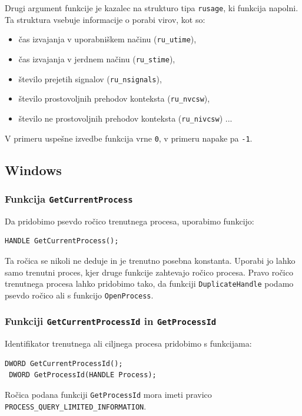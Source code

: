 \documentclass[a4paper,12pt,openright]{book}
\begin{document}
Drugi argument funkcije je kazalec na strukturo tipa \texttt{rusage}, ki funkcija napolni.
Ta struktura vsebuje informacije o porabi virov, kot so:
\begin{itemize}
	\item čas izvajanja v uporabniškem načinu (\texttt{ru\_utime}),
	\item čas izvajanja v jerdnem načinu (\texttt{ru\_stime}),
	\item število prejetih signalov (\texttt{ru\_nsignals}),
	\item število prostovoljnih prehodov konteksta (\texttt{ru\_nvcsw}),
	\item število ne prostovoljnih prehodov konteksta (\texttt{ru\_nivcsw}) ...
\end{itemize}
V primeru uspešne izvedbe funkcija vrne \texttt{0}, v primeru napake pa \texttt{-1}.

\subsection{Windows}

\subsubsection{Funkcija \texttt{GetCurrentProcess}}

Da pridobimo psevdo ročico trenutnega procesa, uporabimo funkcijo:
\begin{lstlisting}[style=func]
 HANDLE GetCurrentProcess();
\end{lstlisting}

Ta ročica se nikoli ne deduje in je trenutno posebna konstanta.
Uporabi jo lahko samo trenutni proces, kjer druge funkcije zahtevajo ročico procesa.
Pravo ročico trenutnega procesa lahko pridobimo tako, da funkciji \texttt{DuplicateHandle} podamo psevdo ročico ali s funkcijo \texttt{OpenProcess}.

\subsubsection{Funkciji \texttt{GetCurrentProcessId} in \texttt{GetProcessId}}

Identifikator trenutnega ali ciljnega procesa pridobimo s funkcijama:
\begin{lstlisting}[style=func]
 DWORD GetCurrentProcessId();
 DWORD GetProcessId(HANDLE Process);
\end{lstlisting}

Ročica podana funkciji \texttt{GetProcessId} mora imeti pravico \texttt{PROCESS\_QUERY\-\_LIMITED\-\_INFORMATION}.
\end{document}
